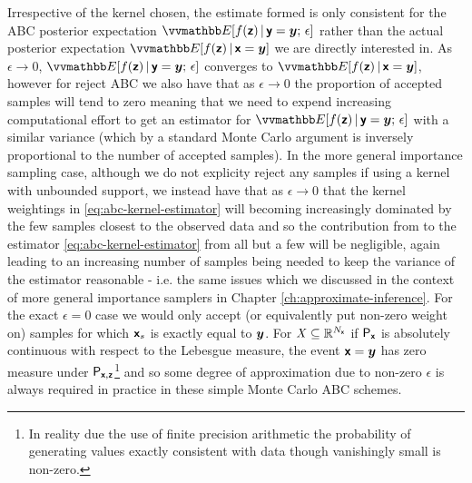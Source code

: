 


Irrespective of the kernel chosen, the estimate formed is only consistent for the \ac{ABC} posterior expectation $\expc{f(\rvct{z}) \gvn \rvct{y} = \vct{y};\,\epsilon}$ rather than the actual posterior expectation $\expc{f(\rvct{z}) \gvn \rvct{x} = \vct{y}}$ we are directly interested in. As $\epsilon \to 0$, $\expc{f(\rvct{z}) \gvn \rvct{y} = \vct{y};\,\epsilon}$ converges to $\expc{f(\rvct{z}) \gvn \rvct{x} = \vct{y}}$, however for reject \ac{ABC} we also have that as $\epsilon \to 0$ the proportion of accepted samples will tend to zero meaning that we need to expend increasing computational effort to get an estimator for $\expc{f(\rvct{z}) \gvn \rvct{y} = \vct{y};\,\epsilon}$ with a similar variance (which by a standard Monte Carlo argument is inversely proportional to the number of accepted samples). In the more general importance sampling case, although we do not explicity reject any samples if using a kernel with unbounded support, we instead have that as $\epsilon \to 0$ that the kernel weightings in \eqref{eq:abc-kernel-estimator} will becoming increasingly dominated by the few samples closest to the observed data and so the contribution from to the estimator \eqref{eq:abc-kernel-estimator} from all but a few will be negligible, again leading to an increasing number of samples being needed to keep the variance of the estimator reasonable - i.e. the same issues which we discussed in the context of more general importance samplers in Chapter \ref{ch:approximate-inference}. For the exact $\epsilon = 0$ case we would only accept (or equivalently put non-zero weight on) samples for which $\boldsymbol{\mathsf{x}}_s$ is exactly equal to $\boldsymbol{y}$. For $\mathit{X} \subseteq \mathbb{R}^{N_{\boldsymbol{\mathsf{x}}}}$ if $\mathsf{P}_{\boldsymbol{\mathsf{x}}}$ is absolutely continuous with respect to the Lebesgue measure, the event $\boldsymbol{\mathsf{x}} = \boldsymbol{y}$ has zero measure under $\mathsf{P}_{\boldsymbol{\mathsf{x}},\boldsymbol{\mathsf{z}}}$\footnote{In reality due the use of finite precision arithmetic the probability of generating values exactly consistent with data though vanishingly small is non-zero.} and so some degree of approximation due to non-zero $\epsilon$ is always required in practice in these simple Monte Carlo \ac{ABC} schemes.

